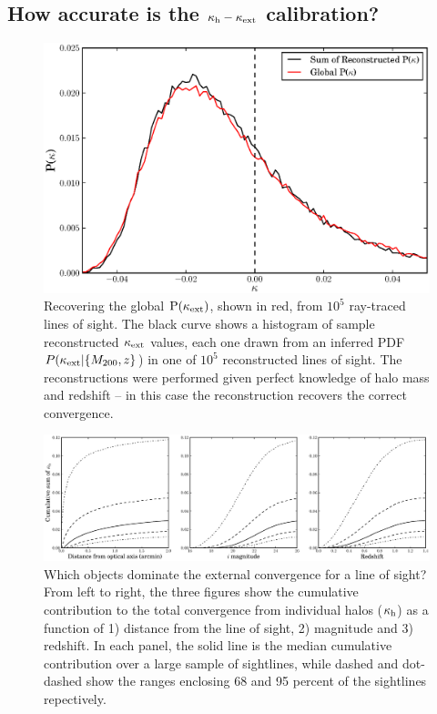 \documentclass[useAMS,usenatbib]{mn2e}
\begin{document}

\subsection{How accurate is the $\kappa_{\rm h} - \kappa_{\rm ext}$ calibration?}

\begin{figure}
\includegraphics[width=\columnwidth]{figs/globaldist.eps}
\caption[magcut]{Recovering the global ${\rm P}(\kappa_{\rm ext})$, shown in red, 
from $10^{5}$ ray-traced lines of
sight. The black curve shows a histogram of 
sample reconstructed 
$\kappa_{\rm ext}$ values, each one drawn from an inferred PDF 
$P(\kappa_{\rm ext}|\{M_{200},z\}$)
in one of $10^{5}$ reconstructed lines of sight. 
The reconstructions were performed given
perfect knowledge of halo mass and redshift -- in this case
the reconstruction recovers the correct convergence.}
\label{fig:globaldist}
\end{figure}

\begin{figure}
\includegraphics[width=\textwidth]{figs/where_is_the_kappa.eps}
\caption[magcut]{Which objects dominate the external convergence for a line of
sight? From left to right, the three figures show the cumulative contribution
to the total  convergence from individual halos ($\kappa_{\rm h}$) as a function of
1)  distance from the line of sight, 2) magnitude and 3) redshift.   In each
panel, the solid line is the median cumulative contribution over a large
sample of sightlines, while dashed and dot-dashed show the ranges enclosing 68
and 95 percent of the sightlines repectively.}
\label{fig:where}
\end{figure}
\end{document}
